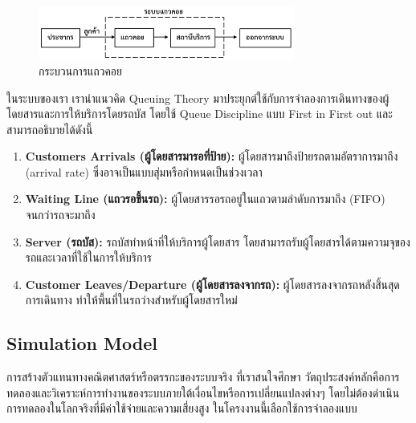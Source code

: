 \begin{figure}[h]
    \centering
    \includegraphics[width=0.75\textwidth]{Query_theory.png}
    \caption{กระบวนการแถวคอย}
    \label{fig:example}
\end{figure}
\indent ในระบบของเรา เรานำแนวคิด Queuing Theory มาประยุกต์ใช้กับการจำลองการเดินทางของผู้โดยสารและการให้บริการโดยรถบัส โดยใช้ Queue Discipline แบบ First in First out และสามารถอธิบายได้ดังนี้
\begin{enumerate}
    \item \textbf{Customers Arrivals (ผู้โดยสารมารอที่ป้าย):} ผู้โดยสารมาถึงป้ายรถตามอัตราการมาถึง (arrival rate) ซึ่งอาจเป็นแบบสุ่มหรือกำหนดเป็นช่วงเวลา
    \item \textbf{Waiting Line (แถวรอขึ้นรถ):} ผู้โดยสารรอรถอยู่ในแถวตามลำดับการมาถึง (FIFO) จนกว่ารถจะมาถึง
    \item \textbf{Server (รถบัส):} รถบัสทำหน้าที่ให้บริการผู้โดยสาร โดยสามารถรับผู้โดยสารได้ตามความจุของรถและเวลาที่ใช้ในการให้บริการ
    \item \textbf{Customer Leaves/Departure (ผู้โดยสารลงจากรถ):} ผู้โดยสารลงจากรถหลังสิ้นสุดการเดินทาง ทำให้พื้นที่ในรถว่างสำหรับผู้โดยสารใหม่
\end{enumerate}

\subsection{Simulation Model}
\begin{mypara}
    \indent การสร้างตัวแทนทางคณิตศาสตร์หรือตรรกะของระบบจริง ที่เราสนใจศึกษา 
    วัตถุประสงค์หลักคือการทดลองและวิเคราะห์การทำงานของระบบภายใต้เงื่อนไขหรือการเปลี่ยนแปลงต่างๆ 
    โดยไม่ต้องดำเนินการทดลองในโลกจริงที่มีค่าใช้จ่ายและความเสี่ยงสูง ในโครงงานนี้เลือกใช้การจำลองแบบ
\end{mypara}
